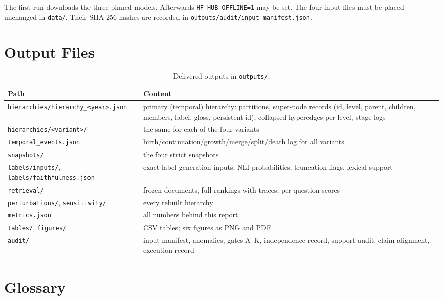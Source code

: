 \documentclass[11pt,a4paper]{article}
\theoremstyle{remark}
\newcommand{\code}[1]{\texttt{\small #1}}
\begin{document}
The first run downloads the three pinned models. Afterwards \code{HF\_HUB\_OFFLINE=1} may be set.
The four input files must be placed unchanged in \code{data/}. Their SHA-256 hashes are
recorded in \code{outputs/audit/input\_manifest.json}.

\section{Output Files}
\label{app:outputs}

\begin{table}[!htbp]
\centering
\caption{Delivered outputs in \code{outputs/}.}
\small
\begin{tabularx}{\linewidth}{lX}
\toprule
Path & Content\\
\midrule
\code{hierarchies/hierarchy\_<year>.json} & primary (temporal) hierarchy: partitions, super-node records (id, level, parent, children, members, label, gloss, persistent id), collapsed hyperedges per level, stage logs\\
\code{hierarchies/<variant>/} & the same for each of the four variants\\
\code{temporal\_events.json} & birth/continuation/growth/merge/split/death log for all variants\\
\code{snapshots/} & the four strict snapshots\\
\code{labels/inputs/}, \code{labels/faithfulness.json} & exact label generation inputs; NLI probabilities, truncation flags, lexical support\\
\code{retrieval/} & frozen documents, full rankings with traces, per-question scores\\
\code{perturbations/}, \code{sensitivity/} & every rebuilt hierarchy\\
\code{metrics.json} & all numbers behind this report\\
\code{tables/}, \code{figures/} & CSV tables; six figures as PNG and PDF\\
\code{audit/} & input manifest, anomalies, gates A--K, independence record, support audit, claim alignment, execution record\\
\bottomrule
\end{tabularx}
\end{table}

\section{Glossary}
\label{app:glossary}
\end{document}
